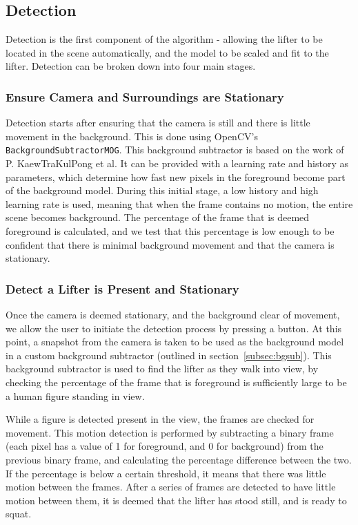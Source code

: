 \subsection{Detection}

Detection is the first component of the algorithm - allowing the lifter to be located in the scene automatically, and the model to be scaled and fit to the lifter. Detection can be broken down into four main stages.

\subsubsection{Ensure Camera and Surroundings are Stationary}
Detection starts after ensuring that the camera is still and there is little movement in the background. This is done using OpenCV's \verb!BackgroundSubtractorMOG!. This background subtractor is based on the work of P. KaewTraKulPong et al\cite{backgroundsubmog}. It can be provided with a learning rate and history as parameters, which determine how fast new pixels in the foreground become part of the background model. During this initial stage, a low history and high learning rate is used, meaning that when the frame contains no motion, the entire scene becomes background. The percentage of the frame that is deemed foreground is calculated, and we test that this percentage is low enough to be confident that there is minimal background movement and that the camera is stationary.

\subsubsection{Detect a Lifter is Present and Stationary}
Once the camera is deemed stationary, and the background clear of movement, we allow the user to initiate the detection process by pressing a button. At this point, a snapshot from the camera is taken to be used as the background model in a custom background subtractor (outlined in section~\ref{subsec:bgsub}). This background subtractor is used to find the lifter as they walk into view, by checking the percentage of the frame that is foreground is sufficiently large to be a human figure standing in view. 

While a figure is detected present in the view, the frames are checked for movement. This motion detection is performed by subtracting a binary frame (each pixel has a value of 1 for foreground, and 0 for background) from the previous binary frame, and calculating the percentage difference between the two. If the percentage is below a certain threshold, it means that there was little motion between the frames. After a series of frames are detected to have little motion between them, it is deemed that the lifter has stood still, and is ready to squat.

